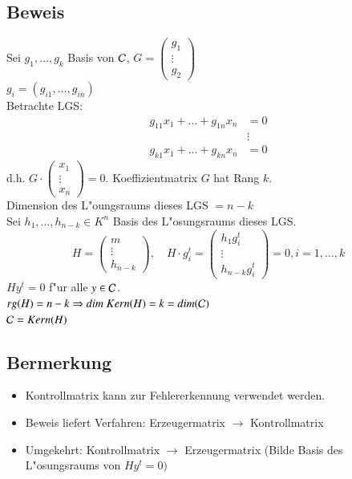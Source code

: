 \subsection{Beweis}
Sei $g_1,\ldots,g_k$ Basis von $\mathcal{C}$, $G=
\begin{pmatrix}
g_1 \\
\vdots \\
g_2
\end{pmatrix} $ \\
$g_i=(g_{i1},\ldots,g_{in})$\\
Betrachte LGS: 
\begin{align*}
	g_{11} x_1 + \ldots + g_{1n} x_n &= 0\\
	&\vdots\\
	g_{k1} x_1 + \ldots + g_{kn} x_n &= 0
\end{align*}
d.h. $G \cdot
\begin{pmatrix}
x_1 \\
\vdots \\
x_n
\end{pmatrix}
= 0$. Koeffizientmatrix $G$ hat Rang $k$.\\
Dimension des L"oungsraums dieses LGS $= n - k$ \\
Sei $h_1,\ldots,h_{n-k} \in K^n$ Basis des L"osungsraums dieses LGS. \\
\[
	H=
	\begin{pmatrix}
	m\\
	\vdots \\
	h_{n-k}
	\end{pmatrix}
	, \quad H \cdot g^t_i =
	\begin{pmatrix}
	h_1 g_i^t \\
	\vdots \\
	h_{n-k} g_i^t
	\end{pmatrix}
	 =0,i=1,\ldots,k
\]
$H y^t=0$ f"ur alle $y \in \mathcal{C}$.\\
$rg(H)=n-k \Rightarrow dim\ Kern(H) = k = dim ( \mathcal{C})$\\
$\mathcal{C}=Kern(H)$

\subsection{Bermerkung}
\begin{itemize}
	\item Kontrollmatrix kann zur Fehlererkennung verwendet werden.	
	\item Beweis liefert Verfahren: Erzeugermatrix $\rightarrow$ Kontrollmatrix
	\item Umgekehrt: Kontrollmatrix $\rightarrow$ Erzeugermatrix (Bilde Basis des L"osungsraums von $H y^t=0)$
\end{itemize}

